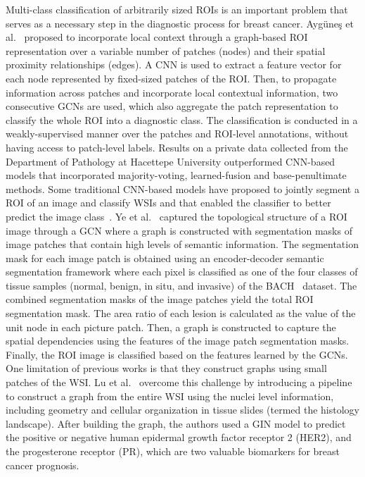 Multi-class classification of arbitrarily sized ROIs is an important problem that serves as a necessary step in the diagnostic process for breast cancer.
Ayg{\"u}ne{\c{s}} et al.~ proposed to incorporate local context through a graph-based ROI representation over a variable number of patches (nodes) and their spatial proximity relationships (edges).
A CNN is used to extract a feature vector for each node represented by fixed-sized patches of the ROI.
Then, to propagate information across patches and incorporate local contextual information, two consecutive GCNs are used, which also aggregate the patch representation to classify the whole ROI into a diagnostic class. 
The classification is conducted in a weakly-supervised manner over the patches and ROI-level annotations, without having access to patch-level labels.
Results on a private data collected from the Department of Pathology at Hacettepe University outperformed CNN-based models that incorporated majority-voting, learned-fusion and base-penultimate methods.
Some traditional CNN-based models have proposed to jointly segment a ROI of an image and classify WSIs and that enabled the classifier to better predict the image class~.
Ye et al.~ captured the topological structure of a ROI image through a GCN where a graph is constructed with segmentation masks of image patches that contain high levels of semantic information.
The segmentation mask for each image patch is obtained using an encoder-decoder semantic segmentation framework where each pixel is classified as one of the four classes of tissue samples (normal, benign, in situ, and invasive) of the BACH~ dataset.
The combined segmentation masks of the image patches yield the total ROI segmentation mask. The area ratio of each lesion is calculated as the value of the unit node in each picture patch. Then, a graph is constructed to capture the spatial dependencies using the features of the image patch segmentation masks. Finally, the ROI image is classified based on the features learned by the GCNs. 
One limitation of previous works is that they construct graphs using small patches of the WSI. Lu et al.~ overcome this challenge by introducing a pipeline to construct a graph from the entire WSI using the nuclei level information, including geometry and cellular organization in tissue slides (termed the histology landscape). 
After building the graph, the authors used a GIN model to predict the positive or negative human epidermal growth factor receptor 2 (HER2), and the progesterone receptor (PR), which are two valuable biomarkers for breast cancer prognosis.

